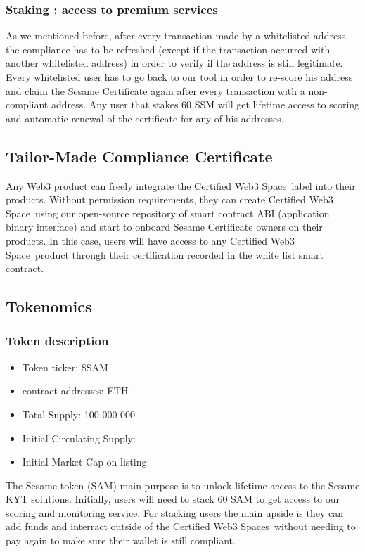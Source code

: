 ﻿\documentclass[a4paper]{article}
\begin{document}
\subsubsection{Staking : access to premium services}
As we mentioned before, after every transaction made by a whitelisted address, the compliance has to be refreshed (except if the transaction occurred with another whitelisted address) in order to verify if the address is still legitimate. Every whitelisted user has to go back to our tool in order to re-score his address and claim the Sesame Certificate again after every transaction with a non-compliant address. Any user that stakes 60 SSM will get lifetime access to scoring and automatic renewal of the certificate for any of his addresses. 

\subsection{Tailor-Made Compliance Certificate} 
Any Web3 product can freely integrate the Certified Web3 Space\texttrademark\ label into their products. Without permission requirements, they can create Certified Web3 Space\texttrademark\ using our open-source repository of smart contract ABI (application binary interface) and start to onboard Sesame Certificate owners on their products. In this case, users will have access to any Certified Web3 Space\texttrademark\ product through their certification recorded in the white list smart contract.


\subsection{Tokenomics}
\subsubsection{Token description}

\begin{itemize}
\item Token ticker: \$SAM
\item contract addresses: ETH 
\item Total Supply: 100 000 000
\item Initial Circulating Supply: 
\item Initial Market Cap on listing: 
\end{itemize}

The Sesame token (SAM) main purpose is to unlock lifetime access to the Sesame KYT solutions. Initially, users will need to stack 60 SAM to get access to our scoring and monitoring service. For stacking users the main upside is they can add funds and interract outside of the Certified Web3 Spaces\texttrademark\ without needing to pay again to make sure their wallet is still compliant. 
\end{document}
